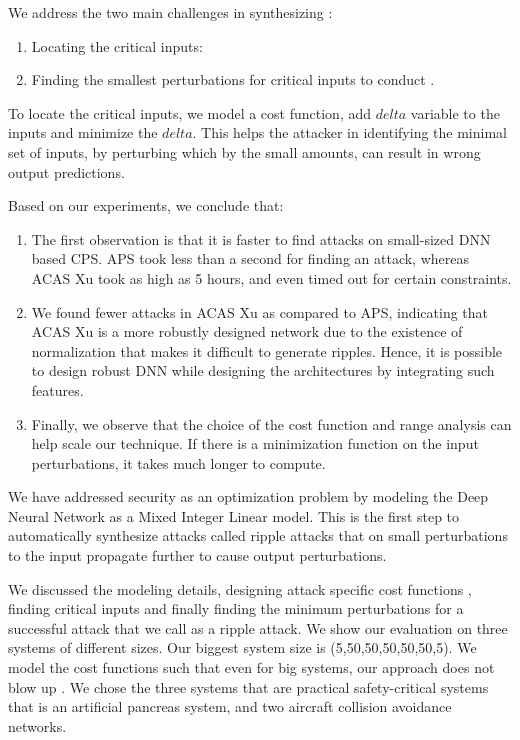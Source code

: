 We address the two main challenges in synthesizing \attack: 
\begin{enumerate}
	\item Locating the critical inputs: 
	
	\item Finding the smallest perturbations for critical inputs to conduct \attack.
	
\end{enumerate}
To locate the critical inputs, we model a cost function,  add $delta$ variable to the inputs and minimize the $delta$. 
This helps the attacker in identifying the minimal set of inputs, by perturbing which by the small amounts, can result in wrong output predictions. 

Based on our experiments, we conclude that:

\begin{enumerate}
	\item The first observation is that it is faster to find attacks on small-sized DNN based CPS. 
	APS took less than a second for finding an attack, whereas ACAS Xu took as high as 5 hours, and even timed out for certain constraints. 
	
	\item We found fewer attacks in ACAS Xu as compared to APS, indicating  that ACAS Xu is a more robustly designed network due to the existence of normalization that makes it difficult to generate ripples. 
	Hence, it is possible to design robust \ac{DNN} while designing the architectures by integrating such features. 
	
	\item Finally, we observe that the choice of the cost function and range analysis can help scale our technique. 
	If there is a minimization function on the input perturbations, it takes much longer to compute.
\end{enumerate}




\iffalse
We have addressed security as an optimization problem by modeling the Deep Neural Network as a Mixed Integer Linear model. This is the first step to automatically synthesize attacks called ripple attacks that on small perturbations to the input propagate further to cause output perturbations. 

We discussed the modeling details, designing attack specific cost functions , finding critical inputs and finally finding the minimum perturbations for a successful attack that we call as a ripple attack. We show our evaluation on three systems of different sizes. Our biggest system size is (5,50,50,50,50,50,5). We model the cost functions such that even for big systems, our approach does not blow up . We chose the three systems that are practical safety-critical systems that is an artificial pancreas system, and two aircraft collision avoidance networks.

